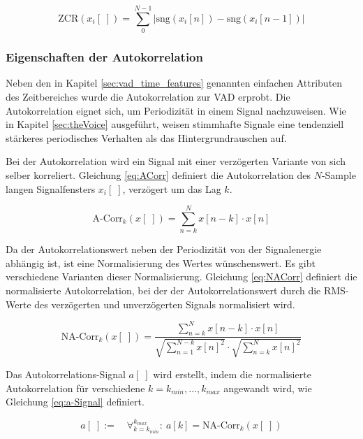 \begin{equation}
\text{ZCR}(x_i[\;]) = \sum_{0}^{N-1}|\text{sng}(x_i[n])-\text{sng}(x_i[n-1])|
\label{eq:zcr}
\end{equation}

\subsubsection{Eigenschaften der Autokorrelation}

Neben den in Kapitel \ref{sec:vad_time_features} genannten \glqq einfachen\grqq{} Attributen des Zeitbereiches wurde die Autokorrelation zur VAD erprobt. Die Autokorrelation eignet sich, um Periodizität in einem Signal nachzuweisen. Wie in Kapitel \ref{sec:theVoice} ausgeführt, weisen stimmhafte Signale eine tendenziell stärkeres periodisches Verhalten als das Hintergrundrauschen auf. 

Bei der Autokorrelation wird ein Signal mit einer verzögerten Variante von sich selber korreliert. Gleichung \ref{eq:ACorr} definiert die Autokorrelation des $N$-Sample langen Signalfensters $x_i[\;]$, verzögert um das Lag $k$.

\begin{equation}
\text{A-Corr}_k(x[\;]) = \sum_{n=k}^{N} x[n-k] \cdot x[n]
\label{eq:ACorr}
\end{equation}

Da der Autokorrelationswert neben der Periodizität von der Signalenergie abhängig ist, ist eine Normalisierung des Wertes wünschenswert. Es gibt verschiedene Varianten dieser Normalisierung. Gleichung \ref{eq:NACorr} definiert die \glqq normalisierte Autokorrelation\grqq{}, bei der der Autokorrelationswert durch die RMS-Werte des verzögerten und unverzögerten Signals normalisiert wird.\cite{vad_Lisboa}

\begin{equation}
\text{NA-Corr}_k(x[\;]) = \frac{\sum_{n=k}^{N} x[n-k] \cdot x[n]}{ \sqrt{\sum_{n=1}^{N-k}  x[n]^2}  \cdot  \sqrt{\sum_{n=k}^{N}  x[n]^2} }
\label{eq:NACorr}
\end{equation}

Das Autokorrelations-Signal $a[\;]$ wird erstellt, indem die normalisierte Autokorrelation für verschiedene $k = k_{min} , \ldots , k_{max}$ angewandt wird, wie Gleichung \ref{eq:a-Signal} definiert. 

\begin{equation}
a[\;] := \quad \mathop{\forall}_{k = k_{min}}^{k_{max}} :\ a[k] = \text{NA-Corr}_k(x[\;]) 
\label{eq:a-Signal}
\end{equation}

